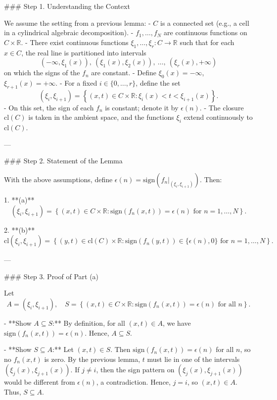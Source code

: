 \documentclass[12pt]{article}
\theoremstyle{mythm}
\let\oldendproof\endproof
\renewenvironment{proof}[1][\proofname]{%
  \oldproof[\normalfont \bfseries \sffamily #1]%
}{\oldendproof}
\renewcommand*{\proofname}{Proof}
\renewcommand*{\proofname}{Proof}
\renewcommand*{\proofname}{Proof}
\renewcommand*{\proofname}{Proof}
\renewcommand*{\proofname}{Proof}
\renewcommand*{\proofname}{Proof}
\renewcommand*{\proofname}{Proof}
\begin{document}
\begin{proof}
    ### Step 1. Understanding the Context

We assume the setting from a previous lemma:  
- \( C \) is a connected set (e.g., a cell in a cylindrical algebraic decomposition).  
- \( f_1, \ldots, f_N \) are continuous functions on \( C \times \mathbb{R} \).  
- There exist continuous functions \( \xi_1, \ldots, \xi_r : C \to \mathbb{R} \) such that for each \( x \in C \), the real line is partitioned into intervals  
  \[
  (-\infty, \xi_1(x)),\ (\xi_1(x), \xi_2(x)),\ \ldots,\ (\xi_r(x), +\infty)
  \]  
  on which the signs of the \( f_n \) are constant.  
- Define \( \xi_0(x) = -\infty \), \( \xi_{r+1}(x) = +\infty \).  
- For a fixed \( i \in \{0, \ldots, r\} \), define the set  
  \[
  (\xi_i, \xi_{i+1}) = \left\{ (x, t) \in C \times \mathbb{R} : \xi_i(x) < t < \xi_{i+1}(x) \right\}.
  \]  
- On this set, the sign of each \( f_n \) is constant; denote it by \( \epsilon(n) \).  
- The closure \( \mathrm{cl}(C) \) is taken in the ambient space, and the functions \( \xi_i \) extend continuously to \( \mathrm{cl}(C) \).

---

### Step 2. Statement of the Lemma

With the above assumptions, define \( \epsilon(n) = \mathrm{sign}(f_n|_{(\xi_i, \xi_{i+1})}) \). Then:

1. **(a)**  
   \[
   (\xi_i, \xi_{i+1}) = \left\{ (x, t) \in C \times \mathbb{R} : \mathrm{sign}(f_n(x, t)) = \epsilon(n) \text{ for } n = 1, \ldots, N \right\}.
   \]

2. **(b)**  
   \[
   \mathrm{cl}(\xi_i, \xi_{i+1}) = \left\{ (y, t) \in \mathrm{cl}(C) \times \mathbb{R} : \mathrm{sign}(f_n(y, t)) \in \{\epsilon(n), 0\} \text{ for } n = 1, \ldots, N \right\}.
   \]

---

### Step 3. Proof of Part (a)

Let  
\[
A = (\xi_i, \xi_{i+1}), \quad S = \left\{ (x, t) \in C \times \mathbb{R} : \mathrm{sign}(f_n(x, t)) = \epsilon(n) \text{ for all } n \right\}.
\]

- **Show \( A \subseteq S \):**  
  By definition, for all \( (x, t) \in A \), we have \( \mathrm{sign}(f_n(x, t)) = \epsilon(n) \). Hence, \( A \subseteq S \).

- **Show \( S \subseteq A \):**  
  Let \( (x, t) \in S \). Then \( \mathrm{sign}(f_n(x, t)) = \epsilon(n) \) for all \( n \), so no \( f_n(x, t) \) is zero.  
  By the previous lemma, \( t \) must lie in one of the intervals \( (\xi_j(x), \xi_{j+1}(x)) \).  
  If \( j \ne i \), then the sign pattern on \( (\xi_j(x), \xi_{j+1}(x)) \) would be different from \( \epsilon(n) \), a contradiction.  
  Hence, \( j = i \), so \( (x, t) \in A \). Thus, \( S \subseteq A \).


\end{proof}
\end{document}

